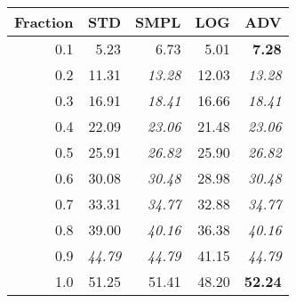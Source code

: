 \documentclass{standalone}
\begin{document}
\begin{tabular}{r|rrrr}
      \toprule
      Fraction & STD & SMPL & LOG & ADV\\
      \midrule
      0.1 & 5.23 & 6.73 & 5.01 & \textbf{7.28}\\
  0.2 & 11.31 & \emph{13.28} & 12.03 & \emph{13.28}\\
  0.3 & 16.91 & \emph{18.41} & 16.66 & \emph{18.41}\\
  0.4 & 22.09 & \emph{23.06} & 21.48 & \emph{23.06}\\
  0.5 & 25.91 & \emph{26.82} & 25.90 & \emph{26.82}\\
  0.6 & 30.08 & \emph{30.48} & 28.98 & \emph{30.48}\\
  0.7 & 33.31 & \emph{34.77} & 32.88 & \emph{34.77}\\
  0.8 & 39.00 & \emph{40.16} & 36.38 & \emph{40.16}\\
  0.9 & \emph{44.79} & \emph{44.79} & 41.15 & \emph{44.79}\\
  1.0 & 51.25 & 51.41 & 48.20 & \textbf{52.24}\\
  \bottomrule
\end{tabular}
\end{document}

